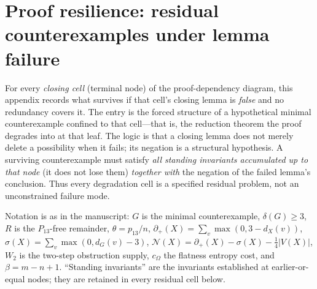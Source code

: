 \documentclass[11pt]{article}
\newcommand{\defp}{\partial_+}
\newcommand{\No}{\mathcal N}
\begin{document}
\clearpage
\section{Proof resilience: residual counterexamples under lemma failure}\label{app:resilience}

For every \emph{closing cell} (terminal node) of the proof-dependency diagram, this appendix records what survives if that cell's closing lemma is \emph{false} and no redundancy covers it.  The entry is the forced structure of a hypothetical minimal counterexample confined to that cell---that is, the reduction theorem the proof degrades into at that leaf.  The logic is that a closing lemma does not merely delete a possibility when it fails; its negation is a structural hypothesis.  A surviving counterexample must satisfy \emph{all standing invariants accumulated up to that node} (it does not lose them) \emph{together with} the negation of the failed lemma's conclusion.  Thus every degradation cell is a specified residual problem, not an unconstrained failure mode.

Notation is as in the manuscript: $G$ is the minimal counterexample, $\delta(G)\ge3$, $R$ is the $P_{13}$-free remainder, $\theta=p_{13}/n$, $\defp(X)=\sum_v\max(0,3-d_X(v))$, $\sigma(X)=\sum_v\max(0,d_G(v)-3)$, $\No(X)=\defp(X)-\sigma(X)-\tfrac14|V(X)|$, $W_2$ is the two-step obstruction supply, $c_\Omega$ the flatness entropy cost, and $\beta=m-n+1$.  ``Standing invariants'' are the invariants established at earlier-or-equal nodes; they are retained in every residual cell below.
\end{document}
